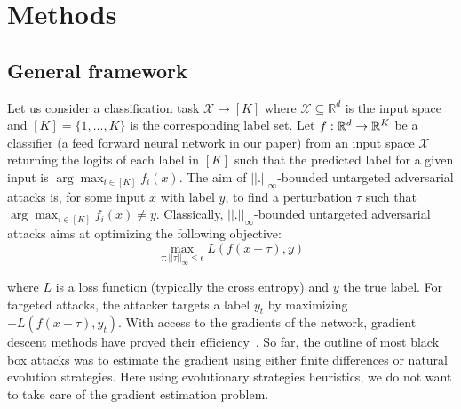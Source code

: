 

\section{Methods}
\label{methods}
\subsection{General framework}
Let us consider a classification task $\mathcal{X} \mapsto \left[K\right]$ where $\mathcal{X}\subseteq\mathbb{R}^d$ is the input space and $\left[K\right]=\{1,...,K\}$ is the corresponding label set. 
Let $f:\mathbb{R}^d\to\mathbb{R}^K$ be a classifier (a feed forward neural network in our paper) from an input space $\mathcal{X}$ returning the logits of each label in $\left[K\right]$ such that the predicted label for a given input is $\arg\max_{i\in\left[K\right]}f_i(x)$. The aim of $||.||_\infty$-bounded untargeted adversarial attacks is, for some input $x$ with label $y$, to find a perturbation $\tau$ such that $\arg\max_{i\in\left[K\right]}f_i(x)\neq y$. Classically, $||.||_\infty$-bounded untargeted adversarial attacks aims at optimizing the following objective:
\begin{equation}
    \max_{\tau : ||\tau||_\infty\leq \epsilon}L(f(x+\tau),y)\label{adv_pb}
\end{equation}

where $L$ is a loss function (typically the cross entropy) and $y$ the true label. For targeted attacks, the attacker targets a label $y_t$ by maximizing $-L(f(x+\tau),y_t)$. With access to the gradients of the network, gradient descent methods have proved their efficiency~\citep{kurakin2016adversarial,madry2018towards}. So far, the outline of most black box attacks was to estimate the gradient using either finite differences or natural evolution strategies. Here using evolutionary strategies heuristics, we do not want to take care of the gradient estimation problem.




